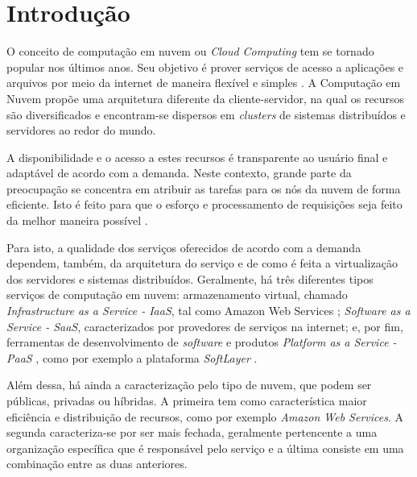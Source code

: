 \chapter{Introdução}\label{cap:introducao}

O conceito de computação em nuvem ou \textit{Cloud Computing} tem se tornado popular nos últimos anos. Seu objetivo é prover serviços de acesso a aplicações e arquivos por meio da internet de maneira flexível e simples \cite{surveycloud:2012}. A Computação em Nuvem propõe uma arquitetura diferente da cliente-servidor, na qual os recursos são diversificados e encontram-se dispersos em \textit{clusters} de sistemas distribuídos e servidores ao redor do mundo. 

A disponibilidade e o acesso a estes recursos é transparente ao usuário final e adaptável de acordo com a demanda. Neste contexto, grande parte da preocupação se concentra em atribuir as tarefas para os nós da nuvem de forma eficiente. Isto é feito para que o esforço e processamento de requisições seja feito da melhor maneira possível \cite{comparativestudy:2010}.  

Para isto, a qualidade dos serviços oferecidos de acordo com a demanda dependem, também, da arquitetura do serviço e de como é feita a virtualização dos servidores e sistemas distribuídos. Geralmente, há três diferentes tipos serviços de computação em nuvem: armazenamento virtual, chamado \textit{Infrastructure as a Service - IaaS}, tal como Amazon Web Services \cite{amazon-cloud}; \textit{Software as a Service - SaaS}, caracterizados por provedores de serviços na internet; e, por fim, ferramentas de desenvolvimento de \textit{software} e produtos \textit{Platform as a Service - PaaS} \cite{loadbalnn}, como por exemplo a plataforma \textit{SoftLayer} \cite{softlayer2}.

Além dessa, há ainda a caracterização pelo tipo de nuvem, que podem ser públicas, privadas ou híbridas. A primeira tem como característica maior eficiência e distribuição de recursos, como por exemplo \textit{Amazon Web Services}. A segunda caracteriza-se por ser mais fechada, geralmente pertencente a uma organização específica que é responsável pelo serviço \cite{zhang2010cloud} e a última consiste em uma combinação entre as duas anteriores.

